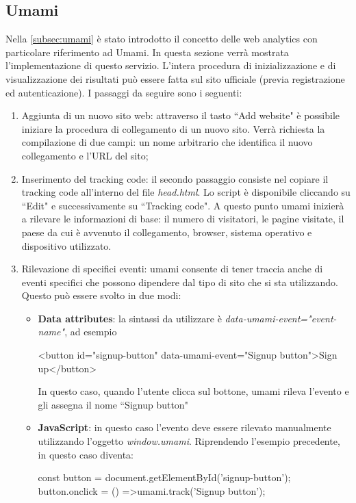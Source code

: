 \documentclass[target=bach,aauheader=]{thud}
\begin{document}
\subsection{Umami}
Nella \cref{subsec:umami} è stato introdotto il concetto delle web analytics con particolare riferimento ad Umami. In questa sezione verrà mostrata l'implementazione di questo servizio. 
\newline \newline
L'intera procedura di inizializzazione e di visualizzazione dei risultati può essere fatta sul sito ufficiale (previa registrazione ed autenticazione). I passaggi da seguire sono i seguenti:
\begin{enumerate}
    \item Aggiunta di un nuovo sito web: attraverso il tasto ``Add website" è possibile iniziare la procedura di collegamento di un nuovo sito. 
          Verrà richiesta la compilazione di due campi: un nome arbitrario che identifica il nuovo collegamento e l'URL del sito;
    \item Inserimento del tracking code: il secondo passaggio consiste nel copiare il tracking code all'interno del file \textit{head.html}. Lo script è disponibile cliccando su ``Edit" e successivamente su ``Tracking code".
          A questo punto umami inizierà a rilevare le informazioni di base: il numero di visitatori, le pagine visitate, il paese da cui è avvenuto il collegamento, browser, sistema operativo e dispositivo utilizzato.
    \item Rilevazione di specifici eventi: umami consente di tener traccia anche di eventi specifici che possono dipendere dal tipo di sito che si sta utilizzando. Questo può essere svolto in due modi:
    \begin{itemize}
        \item \textbf{Data attributes}: la sintassi da utilizzare è \textit{data-umami-event="{event-name}"}, ad esempio 
        \begin{center}
        \textless button id="signup-button" data-umami-event="Signup button"\textgreater Sign up\textless /button\textgreater
        \end{center}
        In questo caso, quando l'utente clicca sul bottone, umami rileva l'evento e gli assegna il nome ``Signup button"
        \item \textbf{JavaScript}: in questo caso l'evento deve essere rilevato manualmente utilizzando l'oggetto \textit{window.umami}. Riprendendo l'esempio precedente, in questo caso diventa:
        \begin{center}
            const button = document.getElementById('signup-button');
            \newline
            button.onclick = () =\textgreater umami.track('Signup button');
        \end{center}
    \end{itemize}
\end{enumerate}
\end{document}
